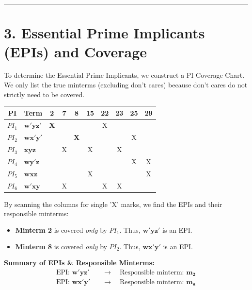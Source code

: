 \documentclass[12pt,a3paper]{article}
\begin{document}
\begin{enumerate}
\begin{tcolorbox}[enhanced,breakable,ansbox,colback=cC!4,colframe=cC,boxrule=0.8pt,arc=5pt,title={\textbf{Answer}},fonttitle=\bfseries\color{white},colbacktitle=cC]
\vspace{0.2cm}
\hrule
\vspace{0.4cm}

\section*{3. Essential Prime Implicants (EPIs) and Coverage}

To determine the Essential Prime Implicants, we construct a PI Coverage Chart. We only list the true minterms (excluding don't cares) because don't cares do not strictly need to be covered.

\begin{center}
\renewcommand{\arraystretch}{1.3}
\begin{tabular}{cl|cccccccc}
    \toprule
    \textbf{PI} & \textbf{Term} & \textbf{2} & \textbf{7} & \textbf{8} & \textbf{15} & \textbf{22} & \textbf{23} & \textbf{25} & \textbf{29} \\ 
    \midrule
    $PI_1$ & $\mathbf{w'yz'}$ & \textcolor{cC}{\textbf{X}} & & & & X & & & \\
    $PI_2$ & $\mathbf{wx'y'}$ & & & \textcolor{cC}{\textbf{X}} & & & & X & \\
    $PI_3$ & $\mathbf{xyz}$ & & X & & X & & X & & \\
    $PI_4$ & $\mathbf{wy'z}$ & & & & & & & X & X \\
    $PI_5$ & $\mathbf{wxz}$ & & & & X & & & & X \\
    $PI_6$ & $\mathbf{w'xy}$ & & X & & & X & X & & \\
    \bottomrule
\end{tabular}
\end{center}

By scanning the columns for single 'X' marks, we find the EPIs and their responsible minterms:
\begin{itemize}
    \item \textbf{Minterm 2} is covered \textit{only} by $PI_1$. Thus, \textcolor{cC}{$\mathbf{w'yz'}$} is an EPI.
    \item \textbf{Minterm 8} is covered \textit{only} by $PI_2$. Thus, \textcolor{cC}{$\mathbf{wx'y'}$} is an EPI.
\end{itemize}

\textbf{Summary of EPIs \& Responsible Minterms:}
\begin{align*}
    \text{EPI: } \mathbf{w'yz'} \quad &\longrightarrow \quad \text{Responsible minterm: } \mathbf{m_2} \\
    \text{EPI: } \mathbf{wx'y'} \quad &\longrightarrow \quad \text{Responsible minterm: } \mathbf{m_8}
\end{align*}


\end{tcolorbox}
\end{enumerate}
\end{document}
